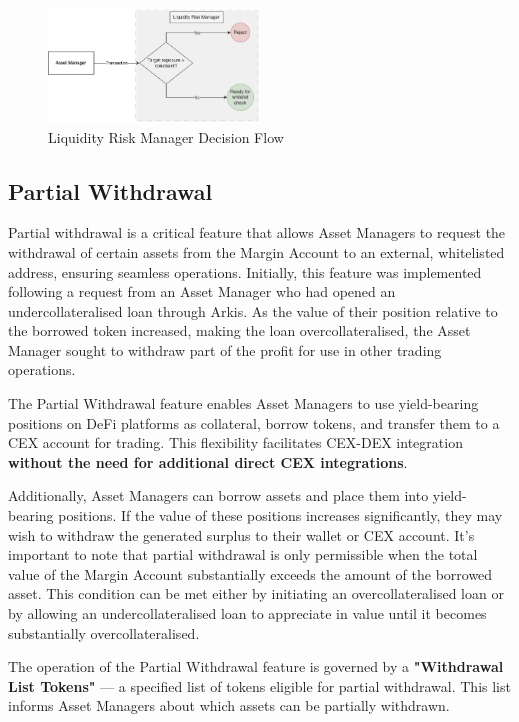 \documentclass[conference]{IEEEtran}
\begin{document}
\begin{figure}[h]
\centering
\includegraphics[width=0.5\textwidth]{images/Liquidity_Risk_Manager.png}
\caption{Liquidity Risk Manager Decision Flow}
\end{figure}



\subsection{Partial Withdrawal}

Partial withdrawal is a critical feature that allows Asset Managers to request the withdrawal of certain assets from the Margin Account to an external, whitelisted address, ensuring seamless operations. Initially, this feature was implemented following a request from an Asset Manager who had opened an undercollateralised loan through Arkis. As the value of their position relative to the borrowed token increased, making the loan overcollateralised, the Asset Manager sought to withdraw part of the profit for use in other trading operations.

The Partial Withdrawal feature enables Asset Managers to use yield-bearing positions on DeFi platforms as collateral, borrow tokens, and transfer them to a CEX account for trading. This flexibility facilitates CEX-DEX integration \textbf{without the need for additional direct CEX integrations}.

Additionally, Asset Managers can borrow assets and place them into yield-bearing positions. If the value of these positions increases significantly, they may wish to withdraw the generated surplus to their wallet or CEX account. It's important to note that partial withdrawal is only permissible when the total value of the Margin Account substantially exceeds the amount of the borrowed asset. This condition can be met either by initiating an overcollateralised loan or by allowing an undercollateralised loan to appreciate in value until it becomes substantially overcollateralised.

The operation of the Partial Withdrawal feature is governed by a \textbf{"Withdrawal List Tokens"} — a specified list of tokens eligible for partial withdrawal. This list informs Asset Managers about which assets can be partially withdrawn.
\end{document}
